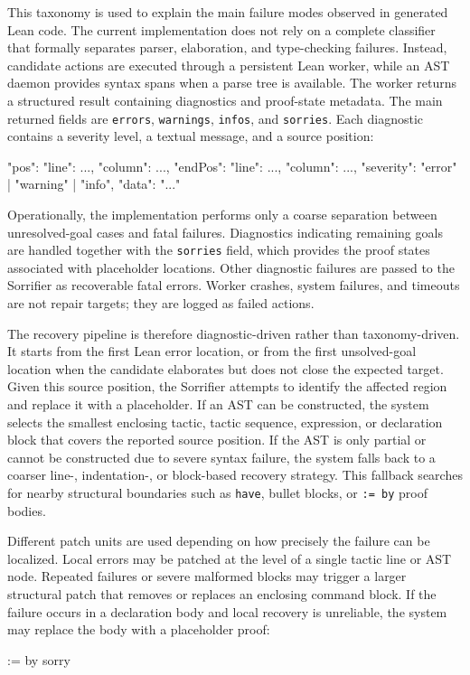 This taxonomy is used to explain the main failure modes observed in generated Lean code. The current
implementation does not rely on a complete classifier that formally separates parser, elaboration, and
type-checking failures. Instead, candidate actions are executed through a persistent Lean worker, while
an AST daemon provides syntax spans when a parse tree is available. The worker returns a structured
result containing diagnostics and proof-state metadata. The main returned fields are
\texttt{errors}, \texttt{warnings}, \texttt{infos}, and \texttt{sorries}. Each diagnostic contains a severity level,
a textual message, and a source position:
\begin{leanblock}
{
  "pos": {"line": ..., "column": ...},
  "endPos": {"line": ..., "column": ...},
  "severity": "error" | "warning" | "info",
  "data": "..."
}
\end{leanblock}

Operationally, the implementation performs only a coarse separation between unresolved-goal cases and
fatal failures. Diagnostics indicating remaining goals are handled together with the \texttt{sorries} field,
which provides the proof states associated with placeholder locations. Other diagnostic failures are passed
to the Sorrifier as recoverable fatal errors. Worker crashes, system failures, and timeouts are not
repair targets; they are logged as failed actions.

The recovery pipeline is therefore diagnostic-driven rather than taxonomy-driven. It starts from the
first Lean error location, or from the first unsolved-goal location when the candidate elaborates but does
not close the expected target. Given this source position, the Sorrifier attempts to identify the
affected region and replace it with a placeholder. If an AST can be constructed, the system selects the
smallest enclosing tactic, tactic sequence, expression, or declaration block that covers the reported
source position. If the AST is only partial or cannot be constructed due to severe syntax failure, the
system falls back to a coarser line-, indentation-, or block-based recovery strategy. This fallback
searches for nearby structural boundaries such as \texttt{have}, bullet blocks, or \texttt{:= by} proof bodies.

Different patch units are used depending on how precisely the failure can be localized. Local errors may
be patched at the level of a single tactic line or AST node. Repeated failures or severe malformed blocks
may trigger a larger structural patch that removes or replaces an enclosing command block. If the failure
occurs in a declaration body and local recovery is unreliable, the system may replace the body with a
placeholder proof:
\begin{leanblock}
:= by
  sorry
\end{leanblock}

